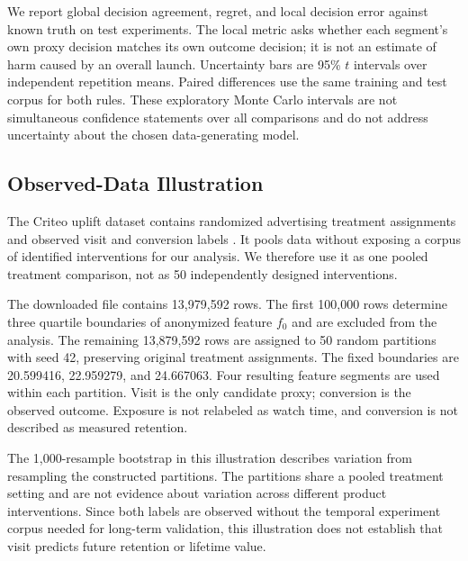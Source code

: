 \documentclass{ieeeaccess}
\begin{document}
We report global decision agreement, regret, and local decision error against known truth on test experiments. The local metric asks whether each segment's own proxy decision matches its own outcome decision; it is not an estimate of harm caused by an overall launch. Uncertainty bars are 95\% $t$ intervals over independent repetition means. Paired differences use the same training and test corpus for both rules. These exploratory Monte Carlo intervals are not simultaneous confidence statements over all comparisons and do not address uncertainty about the chosen data-generating model.

\subsection{Observed-Data Illustration}
The Criteo uplift dataset contains randomized advertising treatment assignments and observed visit and conversion labels \cite{criteo,diemert}. It pools data without exposing a corpus of identified interventions for our analysis. We therefore use it as one pooled treatment comparison, not as 50 independently designed interventions.

The downloaded file contains 13,979,592 rows. The first 100,000 rows determine three quartile boundaries of anonymized feature $f_0$ and are excluded from the analysis. The remaining 13,879,592 rows are assigned to 50 random partitions with seed 42, preserving original treatment assignments. The fixed boundaries are 20.599416, 22.959279, and 24.667063. Four resulting feature segments are used within each partition. Visit is the only candidate proxy; conversion is the observed outcome. Exposure is not relabeled as watch time, and conversion is not described as measured retention.

The 1,000-resample bootstrap in this illustration describes variation from resampling the constructed partitions. The partitions share a pooled treatment setting and are not evidence about variation across different product interventions. Since both labels are observed without the temporal experiment corpus needed for long-term validation, this illustration does not establish that visit predicts future retention or lifetime value.
\end{document}
